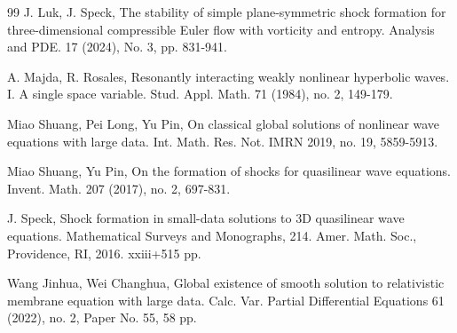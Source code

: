 \documentclass[11pt,twoside]{article}
\begin{document}
\begin{thebibliography}{99}
  J. Luk, J. Speck, The stability of simple plane-symmetric shock formation for three-dimensional compressible
Euler flow with vorticity and entropy. Analysis and PDE. 17 (2024), No. 3, pp. 831-941.

	
	A. Majda, R. Rosales, Resonantly interacting weakly nonlinear hyperbolic waves. I.
A single space variable. Stud. Appl. Math. 71 (1984), no. 2, 149-179.

 Miao Shuang, Pei Long, Yu Pin, On classical global solutions of nonlinear wave equations with large data.
Int. Math. Res. Not. IMRN 2019, no. 19, 5859-5913.
	
 Miao Shuang, Yu Pin, On the formation of shocks for quasilinear wave equations.
Invent. Math. 207 (2017), no. 2, 697-831.
	
	
 J. Speck, Shock formation in small-data solutions to 3D quasilinear wave equations.
Mathematical Surveys and Monographs, 214. Amer. Math. Soc., Providence, RI, 2016. xxiii+515 pp.

 Wang Jinhua, Wei Changhua, Global existence of smooth solution to relativistic membrane
equation with large data. Calc. Var. Partial Differential Equations 61 (2022), no. 2, Paper No. 55, 58 pp.
	
	
	
\end{thebibliography}
\end{document}
